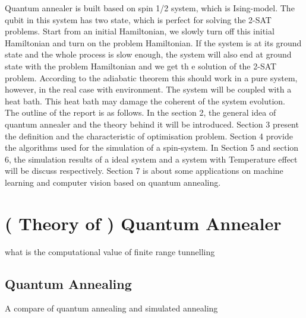 \documentclass[twoside,a4paper,article]{combine}
\begin{document}
Quantum annealer is built based on spin 1/2 system, which is Ising-model. The qubit in this system has two state, which is perfect for solving the 2-SAT problems. Start from an initial Hamiltonian, we slowly turn off this initial Hamiltonian and turn on the problem Hamiltonian. If the system is at its ground state and the whole process is slow enough, the system will also end at ground state with the problem Hamiltonian and we get th e solution of the 2-SAT problem. According to the adiabatic theorem this should work in a pure system, however, in the real case with environment. The system will be coupled with a heat bath. This heat bath may damage the coherent of the system evolution. \\ 

The outline of the report is as follows. In the section 2, the general idea of quantum annealer and the theory behind it will be introduced. Section 3 present the definition and the characteristic of optimisation problem. Section 4 provide the algorithms used for the simulation of a spin-system. In Section 5 and section 6, the simulation results of a ideal system and a system with Temperature effect will be discuss respectively. Section 7 is about some applications on machine learning and computer vision based on quantum annealing.
\\


\newpage

\section{( Theory of ) Quantum Annealer}
\cite{Das2008} 
\cite{Matsuda2009}
\cite{Santoro2006}
\cite{Denchev2015} what is the computational value of finite range tunnelling




\subsection{Quantum Annealing}
\cite{Boixo2014} A compare of quantum annealing and simulated annealing
\end{document}

